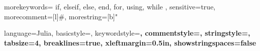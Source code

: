 \usepackage{listings}

{
	morekeywords={
		if, elseif, else, end, for, using, while
	},
	sensitive=true,      %
	morecomment=[l]{\#}, %
	morestring=[b]"
}


{
	language=Julia,
	basicstyle=\ttfamily,
	keywordstyle=\bfseries\color{blue},
	commentstyle=\color{ForestGreen},
	stringstyle=\color{magenta},
	tabsize=4,
	breaklines=true,
	xleftmargin=0.5in,
	showstringspaces=false %
}
